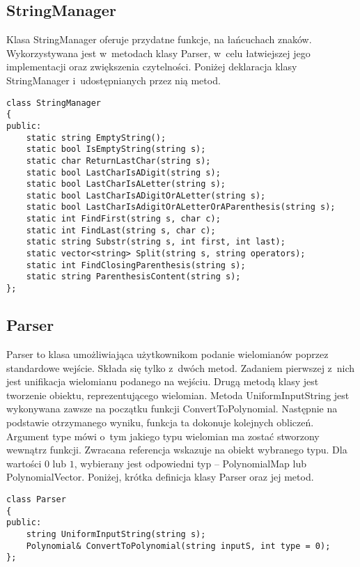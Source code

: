 \subsection{StringManager}

Klasa StringManager oferuje przydatne funkcje, na łańcuchach znaków. Wykorzystywana jest w~metodach klasy Parser, w~celu łatwiejszej jego implementacji oraz zwiększenia czytelności. Poniżej deklaracja klasy StringManager i~udostępnianych przez nią metod.

\begin{lstlisting}
class StringManager
{
public:
	static string EmptyString();
	static bool IsEmptyString(string s);
	static char ReturnLastChar(string s);
	static bool LastCharIsADigit(string s);
	static bool LastCharIsALetter(string s);
	static bool LastCharIsADigitOrALetter(string s);
	static bool LastCharIsAdigitOrALetterOrAParenthesis(string s);
	static int FindFirst(string s, char c);
	static int FindLast(string s, char c);
	static string Substr(string s, int first, int last);
	static vector<string> Split(string s, string operators);
	static int FindClosingParenthesis(string s);
	static string ParenthesisContent(string s);
};
\end{lstlisting}


\subsection{Parser}
Parser to klasa umożliwiająca użytkownikom podanie wielomianów poprzez standardowe wejście. Składa się tylko z~dwóch metod. Zadaniem pierwszej z~nich jest unifikacja wielomianu podanego na wejściu. Drugą metodą klasy jest tworzenie obiektu, reprezentującego wielomian. Metoda UniformInputString jest wykonywana zawsze na początku funkcji ConvertToPolynomial. Następnie na podstawie otrzymanego wyniku, funkcja ta dokonuje kolejnych obliczeń. Argument type mówi o~tym jakiego typu wielomian ma zostać stworzony wewnątrz funkcji. Zwracana referencja wskazuje na obiekt wybranego typu. Dla wartości $0$ lub $1$, wybierany jest odpowiedni typ -- PolynomialMap lub PolynomialVector. Poniżej, krótka definicja klasy Parser oraz jej metod.

\begin{lstlisting}
class Parser
{
public:
	string UniformInputString(string s);
	Polynomial& ConvertToPolynomial(string inputS, int type = 0);
};
\end{lstlisting}


